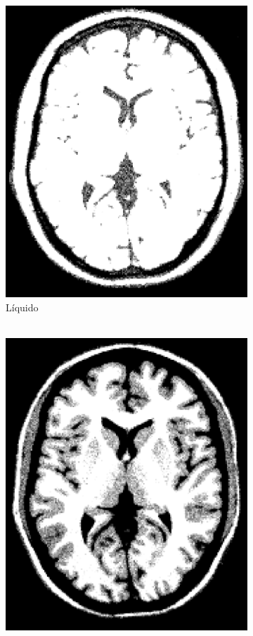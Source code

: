 \documentclass[11pt,twocolumn,twoside]{opticajnl}
\begin{document}
\begin{figure}[h]
\begin{subfigure}[h]{0.24\linewidth}
            \includegraphics[width=\textwidth]{Figuras/ImageA_25_62.png}
            \caption{Líquido \\ 
            $~$} 
         \end{subfigure}
         \begin{subfigure}[h]{0.24\linewidth}
            \centering
            \includegraphics[width=\textwidth]{Figuras/ImageA_62_113.png}

\end{subfigure}
\end{figure}
\end{document}
